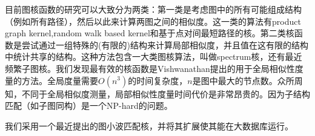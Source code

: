 \documentclass{article}
\begin{document}
目前图核函数的研究可以大致分为两类：第一类是考虑图中的所有可能组成结构（例如所有路径），然后以此来计算两图之间的相似度。这一类的算法有product graph kernel,random walk based kernel和基于点对间最短路径的核。第二类核函数是尝试通过一组特殊的(有限的)结构来计算局部相似度，并且值在这有限的结构中统计共享的结构。这种方法包含一大类图核算法，叫做spectrum核，还有最近频繁子图核。我们发现最有效的核函数是Vishwanathan提出的用于全局相似性度量的方法。全局度量需要$O(n^3 )$的时间复杂度，$n$是图中最大的节点数。众所周知，不同于全局相似度测量，局部相似性度量时间代价是非常昂贵的。因为子结构匹配（如子图同构）是一个NP-hard的问题。

我们采用一个最近提出的图小波匹配核，并将其扩展使其能在大数据库运行。

\ifx\allfiles\undefined
%
%
\end{document}

